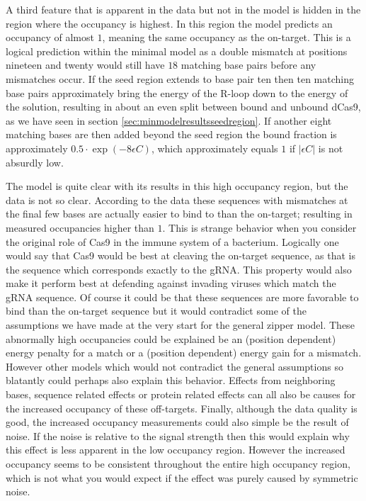 A third feature that is apparent in the data but not in the model is hidden in the region where the occupancy is highest. In this region the model predicts an occupancy of almost $1$, meaning the same occupancy as the on-target. This is a logical prediction within the minimal model as a double mismatch at positions nineteen and twenty would still have $18$ matching base pairs before any mismatches occur. If the seed region extends to base pair ten then ten matching base pairs approximately bring the energy of the R-loop down to the energy of the solution, resulting in about an even split between bound and unbound dCas9, as we have seen in section \ref{sec:minmodelresultsseedregion}. If another eight matching bases are then added beyond the seed region the bound fraction is approximately $0.5 \cdot \exp(-8\epsilon C)$, which approximately equals $1$ if $|\epsilon C|$ is not absurdly low.

The model is quite clear with its results in this high occupancy region, but the data is not so clear. According to the data these sequences with mismatches at the final few bases are actually easier to bind to than the on-target; resulting in measured occupancies higher than $1$. This is strange behavior when you consider the original role of Cas9 in the immune system of a bacterium. Logically one would say that Cas9 would be best at cleaving the on-target sequence, as that is the sequence which corresponds exactly to the gRNA. This property would also make it perform best at defending against invading viruses which match the gRNA sequence. Of course it could be that these sequences are more favorable to bind than the on-target sequence but it would contradict some of the assumptions we have made at the very start for the general zipper model. These abnormally high occupancies could be explained be an (position dependent) energy penalty for a match or a (position dependent) energy gain for a mismatch. However other models which would not contradict the general assumptions so blatantly could perhaps also explain this behavior. Effects from neighboring bases, sequence related effects or protein related effects can all also be causes for the increased occupancy of these off-targets. Finally, although the data quality is good, %
the increased occupancy measurements could also simple be the result of noise. If the noise is relative to the signal strength then this would explain why this effect is less apparent in the low occupancy region. However the increased occupancy seems to be consistent throughout the entire high occupancy region, which is not what you would expect if the effect was purely caused by symmetric noise.

